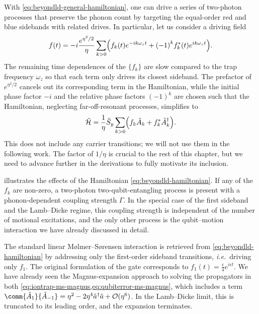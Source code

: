 With \cref{eq:beyondld-general-hamiltonian}, one can drive a series of two-photon processes that preserve the phonon count by targeting the equal-order red and blue sidebands with related drives.
In particular, let us consider a driving field
\begin{equation}\label{eq:beyondld-driving-field}
f(t) = - i \frac{e^{\eta^2/2}}\eta \sum_{k>0} \Bigl(f_k(t) e^{-ik\omega_z t} + {(-1)}^k f_k^*(t)e^{ik\omega_z t}\Bigr).
\end{equation}
The remaining time dependences of the $\{f_k\}$ are slow compared to the trap frequency $\omega_z$ so that each term only drives its closest sideband.
The prefactor of $e^{\eta^2/2}$ cancels out its corresponding term in the Hamiltonian, while the initial phase factor $-i$ and the relative phase factors ${(-1)}^k$ are chosen such that the Hamiltonian, neglecting far-off-resonant processes, simplifies to
\begin{equation}\label{eq:beyondld-hamiltonian}
\hat{\mathcal H} = \frac1\eta\hat{S}_y\sum_{k>0}\Bigl(f_k \hat{A}_k + f_k^* \hat{A}_k^\dagger\Bigr).
\end{equation}
This does not include any carrier transitions; we will not use them in the following work.
The factor of $1/\eta$ is crucial to the rest of this chapter, but we need to advance further in the derivations to fully motivate its inclusion.

 illustrates the effects of the Hamiltonian \cref{eq:beyondld-hamiltonian}.
If any of the $f_k$ are non-zero, a two-photon two-qubit-entangling process is present with a phonon-dependent coupling strength $\Gamma$.
In the special case of the first sideband and the Lamb--Dicke regime, this coupling strength is independent of the number of motional excitations, and the only other process is the qubit--motion interaction we have already discussed in detail.

The standard linear M\o lmer--S\o rensen interaction is retrieved from \cref{eq:beyondld-hamiltonian} by addressing only the first-order sideband transitions, \textit{i.e.}\ driving only $f_1$.
The original formulation of the gate corresponds to $f_1(t) = \frac\epsilon4e^{i\epsilon t}$.
We have already seen the Magnus-expansion approach to solving the propagators in both \cref{eq:iontrap-ms-magnus,eq:qubiterror-ms-magnus}, which includes a term $\comm{\op A_1}{\op A_{-1}} = \eta^2 - 2\eta^4\a^\dagger\a + \order{\eta^6}$.
In the Lamb--Dicke limit, this is truncated to its leading order, and the expansion terminates.

